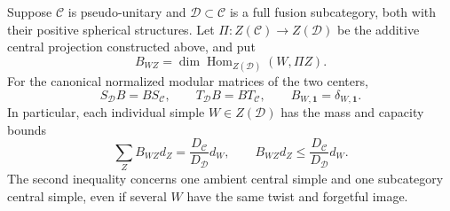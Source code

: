\begin{proposition}
\label{prop:modular-subcategory-projection}
Suppose $\mathcal C$ is pseudo-unitary and $\mathcal D\subset\mathcal C$
is a full fusion subcategory, both with their positive spherical structures.
Let $\Pi:Z(\mathcal C)\to Z(\mathcal D)$ be the additive central
projection constructed above, and put
\[
 B_{WZ}=\dim\operatorname{Hom}_{Z(\mathcal D)}(W,\Pi Z).
\]
For the canonical normalized modular matrices of the two centers,
\begin{equation}\label{eq:subcategory-modular-intertwiner}
 S_{\mathcal D}B=BS_{\mathcal C},\qquad
 T_{\mathcal D}B=BT_{\mathcal C},\qquad
 B_{W,\mathbf1}=\delta_{W,\mathbf1}.
\end{equation}
In particular, each individual simple $W\in Z(\mathcal D)$ has the mass
and capacity bounds
\begin{equation}\label{eq:individual-central-projection-capacity}
 \sum_Z B_{WZ}d_Z
   =\frac{D_{\mathcal C}}{D_{\mathcal D}}d_W,
 \qquad
 B_{WZ}d_Z\le\frac{D_{\mathcal C}}{D_{\mathcal D}}d_W.
\end{equation}
The second inequality concerns one ambient central simple and one
subcategory central simple, even if several $W$ have the same twist and
forgetful image.
\end{proposition}
